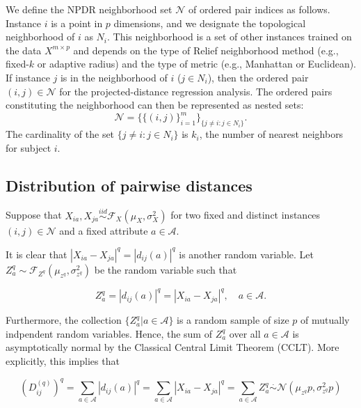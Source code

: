 \documentclass[10pt,letterpaper]{article}\usepackage[]{graphicx}\usepackage[]{color}
\begin{document}
We define the NPDR neighborhood set $\mathcal{N}$ of ordered pair indices as follows. Instance $i$ is a point in $p$ dimensions, and we designate the topological neighborhood of $i$ as $N_{i}$. This neighborhood is a set of other instances trained on the data $X^{m \times p}$ and depends on the type of Relief neighborhood method (e.g., fixed-$k$ or adaptive radius) and the type of metric (e.g., Manhattan or Euclidean). If instance $j$ is in the neighborhood of $i$ ($j \in N_{i}$), then the ordered pair $(i,j) \in \mathcal{N}$ for the projected-distance regression analysis. The ordered pairs constituting the neighborhood can then be represented as nested sets:
\begin{equation}\label{eq:N}
\mathcal{N}=\{\{(i, j)\}_{i=1}^{m}\}_{\{j \ne i : j \in N_{i}\}}.
\end{equation}
The cardinality of the set $\{j \ne i : j \in N_{i}\}$ is $k_i$, the number of nearest neighbors for subject $i$. 

\subsection{Distribution of pairwise distances}

Suppose that $X_{ia}, X_{ja} \overset{iid}{\sim} \mathcal{F}_X(\mu_X,\sigma^2_X)$ for two fixed and distinct instances $(i,j) \in \mathcal{N}$ and a fixed attribute $a \in \mathcal{A}$. 

It is clear that $|X_{ia} - X_{ja}|^q = |d_{ij}(a)|^q$ is another random variable. Let $Z^q_a \sim \mathcal{F}_{Z^q}(\mu_{z^q},\sigma^2_{z^q})$ be the random variable such that

\begin{equation}\label{eq:diffDistr}
Z^q_a = |d_{ij}(a)|^q = |X_{ia} - X_{ja}|^q, \quad a \in \mathcal{A}.
\end{equation}

Furthermore, the collection $\{Z^q_a | a \in \mathcal{A}\}$ is a random sample of size $p$ of mutually indpendent random variables. Hence, the sum of $Z^q_a$ over all $a \in \mathcal{A}$ is asymptotically normal by the Classical Central Limit Theorem (CCLT). More explicitly, this implies that

\begin{equation}\label{eq:DqAsympt}
\left(D^{(q)}_{ij}\right)^q = \sum_{a \in \mathcal{A}} |d_{ij}(a)|^q = \sum_{a \in \mathcal{A}} |X_{ia} - X_{ja}|^q = \sum_{a \in \mathcal{A}} Z^q_a \overset{.}{\sim} \mathcal{N}\left(\mu_{z^q}p,\sigma^2_{z^q}p\right)
\end{equation}
\end{document}
